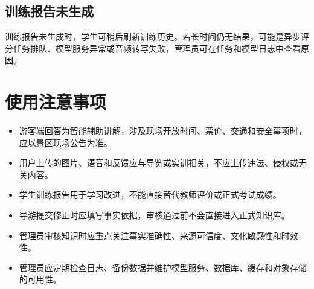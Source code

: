 \subsection{训练报告未生成}

训练报告未生成时，学生可稍后刷新训练历史。若长时间仍无结果，可能是异步评分任务排队、模型服务异常或音频转写失败，管理员可在任务和模型日志中查看原因。

\section{使用注意事项}

\begin{itemize}[leftmargin=2em]
  \item 游客端回答为智能辅助讲解，涉及现场开放时间、票价、交通和安全事项时，应以景区现场公告为准。
  \item 用户上传的图片、语音和反馈应与导览或实训相关，不应上传违法、侵权或无关内容。
  \item 学生训练报告用于学习改进，不能直接替代教师评价或正式考试成绩。
  \item 导游提交修正时应填写事实依据，审核通过前不会直接进入正式知识库。
  \item 管理员审核知识时应重点关注事实准确性、来源可信度、文化敏感性和时效性。
  \item 管理员应定期检查日志、备份数据并维护模型服务、数据库、缓存和对象存储的可用性。
\end{itemize}
